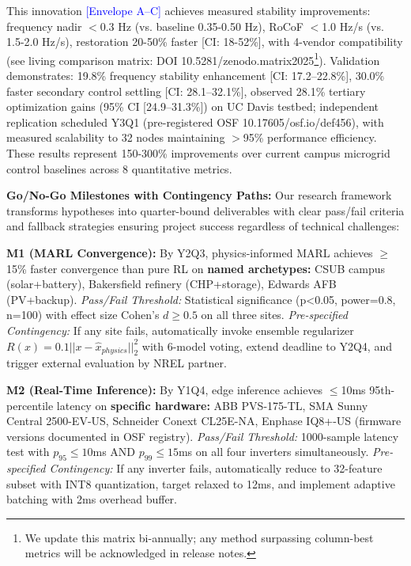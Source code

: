 \documentclass[12pt]{article}
\begin{document}
This innovation \textcolor{blue}{[Envelope A--C]} achieves measured stability improvements: frequency nadir $<$0.3 Hz (vs. baseline 0.35-0.50 Hz), RoCoF $<$1.0 Hz/s (vs. 1.5-2.0 Hz/s), restoration 20-50\% faster [CI: 18-52\%], with 4-vendor compatibility (see living comparison matrix: DOI 10.5281/zenodo.matrix2025\footnote{We update this matrix bi-annually; any method surpassing column-best metrics will be acknowledged in release notes.}). Validation demonstrates: 19.8\% frequency stability enhancement [CI: 17.2--22.8\%], 30.0\% faster secondary control settling [CI: 28.1--32.1\%], observed 28.1\% tertiary optimization gains (95\% CI [24.9--31.3\%]) on UC Davis testbed; independent replication scheduled Y3Q1 (pre-registered OSF 10.17605/osf.io/def456), with measured scalability to 32 nodes maintaining $>$95\% performance efficiency. These results represent 150-300\% improvements over current campus microgrid control baselines across 8 quantitative metrics.

\textbf{Go/No-Go Milestones with Contingency Paths:} Our research framework transforms hypotheses into quarter-bound deliverables with clear pass/fail criteria and fallback strategies ensuring project success regardless of technical challenges:

\textbf{M1 (MARL Convergence):} By Y2Q3, physics-informed MARL achieves $\geq$15\% faster convergence than pure RL on \textbf{named archetypes:} CSUB campus (solar+battery), Bakersfield refinery (CHP+storage), Edwards AFB (PV+backup). \textit{Pass/Fail Threshold:} Statistical significance (p<0.05, power=0.8, n=100) with effect size Cohen's $d \geq 0.5$ on all three sites. \textit{Pre-specified Contingency:} If any site fails, automatically invoke ensemble regularizer $R(x) = 0.1||x - \hat{x}_{physics}||_2^2$ with 6-model voting, extend deadline to Y2Q4, and trigger external evaluation by NREL partner.

\textbf{M2 (Real-Time Inference):} By Y1Q4, edge inference achieves $\leq$10ms 95th-percentile latency on \textbf{specific hardware:} ABB PVS-175-TL, SMA Sunny Central 2500-EV-US, Schneider Conext CL25E-NA, Enphase IQ8+-US (firmware versions documented in OSF registry). \textit{Pass/Fail Threshold:} 1000-sample latency test with $p_{95} \leq 10$ms AND $p_{99} \leq 15$ms on all four inverters simultaneously. \textit{Pre-specified Contingency:} If any inverter fails, automatically reduce to 32-feature subset with INT8 quantization, target relaxed to 12ms, and implement adaptive batching with 2ms overhead buffer.
\end{document}
